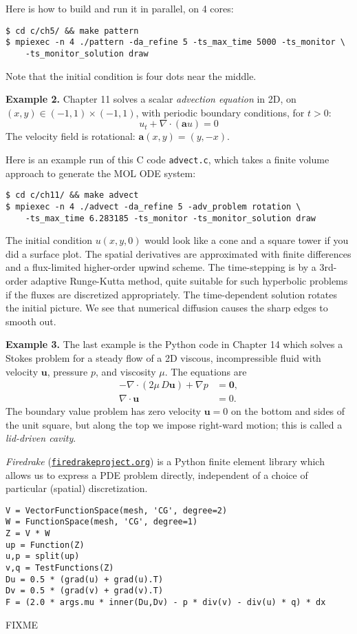 \documentclass[12pt]{amsart}
\newcommand{\bu}{\mathbf{u}}
\newcommand{\Div}{\nabla\cdot}
\newcommand{\grad}{\nabla}
\begin{document}
Here is how to build and run it in parallel, on 4 cores:

\medskip
\begin{Verbatim}[fontsize=\small]
$ cd c/ch5/ && make pattern
$ mpiexec -n 4 ./pattern -da_refine 5 -ts_max_time 5000 -ts_monitor \
    -ts_monitor_solution draw
\end{Verbatim}

\medskip
\noindent Note that the initial condition is four dots near the middle.

\bigskip
\noindent \textbf{Example 2.}  Chapter 11 solves a scalar \emph{advection equation} in 2D, on $(x,y) \in (-1,1)\times (-1,1)$, with periodic boundary conditions, for $t>0$:
    $$u_t + \nabla \cdot (\mathbf{a} u) = 0$$
The velocity field is rotational: $\mathbf{a}(x,y) = (y, -x)$.

Here is an example run of this C code \texttt{advect.c}, which takes a finite volume approach to generate the MOL ODE system:

\medskip
\begin{Verbatim}[fontsize=\small]
$ cd c/ch11/ && make advect
$ mpiexec -n 4 ./advect -da_refine 5 -adv_problem rotation \
    -ts_max_time 6.283185 -ts_monitor -ts_monitor_solution draw
\end{Verbatim}

\medskip
The initial condition $u(x,y,0)$ would look like a cone and a square tower if you did a surface plot.  The spatial derivatives are approximated with finite differences and a flux-limited higher-order upwind scheme.  The time-stepping is by a 3rd-order adaptive Runge-Kutta method, quite suitable for such hyperbolic problems if the fluxes are discretized appropriately.  The time-dependent solution rotates the initial picture.  We see that numerical diffusion causes the sharp edges to smooth out.  

\bigskip
\noindent \textbf{Example 3.}  The last example is the Python code in Chapter 14 which solves a Stokes problem for a steady flow of a 2D viscous, incompressible fluid with velocity $\bu$, pressure $p$, and viscosity $\mu$.  The equations are
\begin{align*}
- \Div \left(2 \mu\, D \bu\right) + \grad p &= \bm{0}, \\
\Div \bu &= 0.
\end{align*}
The boundary value problem has zero velocity $\bu=0$ on the bottom and sides of the unit square, but along the top we impose right-ward motion; this is called a \emph{lid-driven cavity}.

\emph{Firedrake} (\href{https://www.firedrakeproject.org/}{\texttt{firedrakeproject.org}}) is a Python finite element library which allows us to express a PDE problem directly, independent of a choice of particular (spatial) discretization.

\medskip
\begin{Verbatim}[fontsize=\small]
V = VectorFunctionSpace(mesh, 'CG', degree=2)
W = FunctionSpace(mesh, 'CG', degree=1)
Z = V * W
up = Function(Z)
u,p = split(up)
v,q = TestFunctions(Z)
Du = 0.5 * (grad(u) + grad(u).T)
Dv = 0.5 * (grad(v) + grad(v).T)
F = (2.0 * args.mu * inner(Du,Dv) - p * div(v) - div(u) * q) * dx
\end{Verbatim}

FIXME
\end{document}
